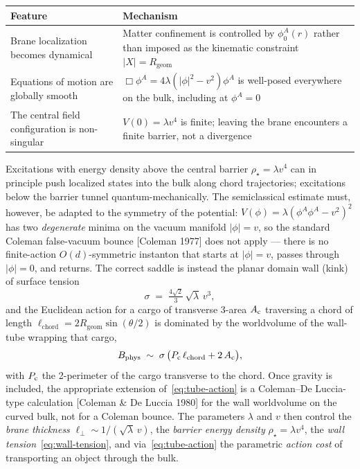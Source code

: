 \documentclass[11pt,a4paper]{article}
\newcommand{\Rgeom}{R_{\mathrm{geom}}}
\begin{document}
\begin{table}[H]
\centering
\begin{tabularx}{\linewidth}{@{}lX@{}}
\toprule
Feature & Mechanism \\
\midrule
Brane localization becomes dynamical & Matter confinement is controlled by $\phi_0^A(r)$ rather than imposed as the kinematic constraint $\lvert X\rvert = \Rgeom$ \\
Equations of motion are globally smooth & $\Box \phi^A = 4 \lambda (\lvert\phi\rvert^2 - v^2) \phi^A$ is well-posed everywhere on the bulk, including at $\phi^A = 0$ \\
The central field configuration is non-singular & $V(0) = \lambda v^4$ is finite; leaving the brane encounters a finite barrier, not a divergence \\
\bottomrule
\end{tabularx}
\end{table}

Excitations with energy density above the central barrier $\rho_\star=\lambda v^4$ can in principle push localized states into the bulk along chord trajectories; excitations below the barrier tunnel quantum-mechanically. The semiclassical estimate must, however, be adapted to the symmetry of the potential: $V(\phi)=\lambda(\phi^A\phi^A-v^2)^2$ has two \emph{degenerate} minima on the vacuum manifold $|\phi|=v$, so the standard Coleman false-vacuum bounce [Coleman 1977] does not apply --- there is no finite-action $O(d)$-symmetric instanton that starts at $|\phi|=v$, passes through $|\phi|=0$, and returns. The correct saddle is instead the planar domain wall (kink) of surface tension
\begin{equation}
\sigma \;=\; \tfrac{4\sqrt{2}}{3}\,\sqrt{\lambda}\,v^3,
\label{eq:wall-tension}
\end{equation}
and the Euclidean action for a cargo of transverse 3-area $A_{\rm c}$ traversing a chord of length $\ell_{\mathrm{chord}}=2\Rgeom\sin(\theta/2)$ is dominated by the worldvolume of the wall-tube wrapping that cargo,
\begin{equation}
B_{\rm phys} \;\sim\; \sigma\,\bigl(P_{\rm c}\,\ell_{\mathrm{chord}} + 2\,A_{\rm c}\bigr),
\label{eq:tube-action}
\end{equation}
with $P_{\rm c}$ the 2-perimeter of the cargo transverse to the chord. Once gravity is included, the appropriate extension of~\eqref{eq:tube-action} is a Coleman--De Luccia-type calculation [Coleman \& De Luccia 1980] for the wall worldvolume on the curved bulk, not for a Coleman bounce. The parameters $\lambda$ and $v$ then control the \emph{brane thickness} $\ell_\perp \sim 1/(\sqrt{\lambda}\,v)$, the \emph{barrier energy density} $\rho_\star=\lambda v^4$, the \emph{wall tension}~\eqref{eq:wall-tension}, and via~\eqref{eq:tube-action} the parametric \emph{action cost} of transporting an object through the bulk.
\end{document}
